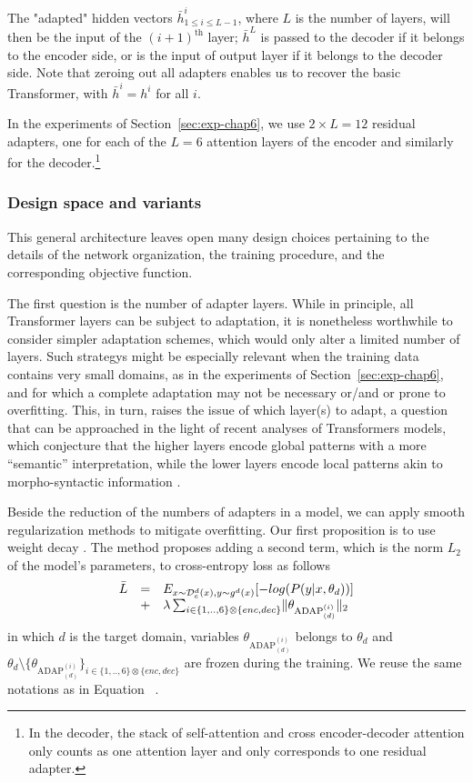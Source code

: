 The "adapted" hidden vectors $\bar{h}^i_{ 1\leq i \leq L-1}$, where $L$ is the number of layers, will then be the input of the $(i+1)^{\text{th}}$ layer; $\bar{h}^L$ is passed to the decoder if it belongs to the encoder side, or is the input of output layer if it belongs to the decoder side. Note that zeroing out all adapters enables us to recover the basic Transformer, with $\bar{h}^{i} = h^i$ for all $i$.

In the experiments of Section~\ref{sec:exp-chap6}, we use $2\times{}L=12$ residual adapters, one for each of the $L=6$ attention layers of the encoder and similarly for the decoder.\footnote{In the decoder, the stack of self-attention and cross encoder-decoder attention only counts as one attention layer and only corresponds to one residual adapter.}

\subsubsection{Design space and variants}
\label{sssec:design-space-chap6}
This general architecture leaves open many design choices pertaining to the details of the network organization, the training procedure, and the corresponding objective function.

The first question is the number of adapter layers. While in principle, all Transformer layers can be subject to adaptation, it is nonetheless worthwhile to consider simpler adaptation schemes, which would only alter a limited number of layers. Such strategys might be especially relevant when the training data contains very small domains, as in the experiments of Section~\ref{sec:exp-chap6}, and for which a complete adaptation may not be necessary or/and or prone to overfitting. This, in turn, raises the issue of which layer(s) to adapt, a question that can be approached in the light of recent analyses of Transformers models, which conjecture that the higher layers encode global patterns with a more ``semantic'' interpretation, while the lower layers encode local patterns akin to morpho-syntactic information \cite{raganato18analysis}.

Beside the reduction of the numbers of adapters in a model, we can apply smooth regularization methods to mitigate overfitting. Our first proposition is to use weight decay \citep{Krogh91simple}. The method proposes adding a second term, which is the norm $L_2$ of the model's parameters, to cross-entropy loss as follows
\begin{equation*}
  \begin{array}{rcl}
  \bar{L} & = &  E_{x \sim \mathcal{D}_e^d(x), y \sim g^d(x)} [-log(P(y|x,\theta_d))] \\
    & + & \lambda  \sum_{i \in \{1,..,6\} \otimes \{enc, dec\}} \normL{\theta_{\operatorname{ADAP}^{(i)}_{(d)}}}
  \end{array}
\end{equation*}
in which $d$ is the target domain, variables $\theta_{\operatorname{ADAP}^{(i)}_{(d)}}$ belongs to $\theta_d$ and $\theta_d \setminus \{ \theta_{\operatorname{ADAP}^{(i)}_{(d)}} \}_{i \in \{1,..,6\} \otimes \{enc, dec\}}$ are frozen during the training.
We reuse the same notations as in Equation ~.

